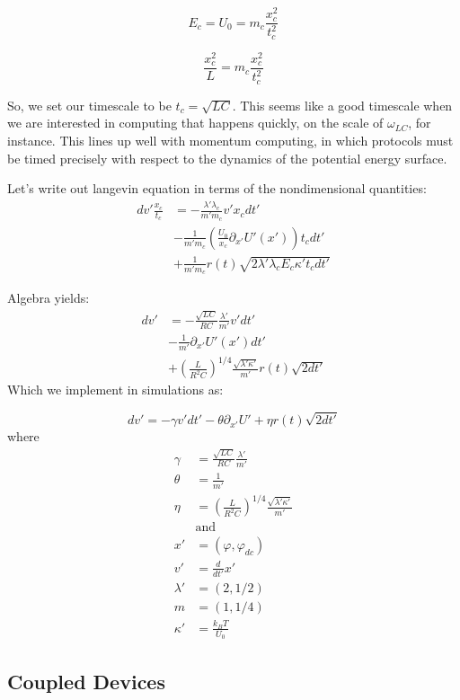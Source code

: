 \documentclass[paper=a4, twocolumn, fontsize=10pt]{article} %
\numberwithin{equation}{section} %
\numberwithin{figure}{section} %
\numberwithin{table}{section} %
\begin{document}
\[ E_c = U_0 = m_c \frac{ x^2_c}{t^2_c} \]

\[ \frac{x_c^2}{L} = m_c \frac{ x^2_c}{t^2_c} \]

So, we set our timescale to be $t_c = \sqrt{LC} $. This seems like a good timescale when we are interested in computing that happens quickly, on the scale of $\omega_{LC}$, for instance. This lines up well with momentum computing, in which protocols must be timed precisely with respect to the dynamics of the potential energy surface.


Let's write out langevin equation in terms of the nondimensional quantities:
\begin{align*}
dv' \frac{x_c}{t_c} &= -\frac{\lambda' \lambda_c}{m' m_c} v' x_c  dt' \\
 &- \frac{1}{m' m_c} \left(\frac{U_0}{x_c} \partial_{x'} U'(x')\right)  t_c dt' \\
  &+ \frac{1}{m'm_c} r(t)\sqrt{2\lambda'\lambda_c E_c \kappa' t_c dt'}
\end{align*}
    
Algebra yields:
\begin{align*}
dv' &= -\frac{\sqrt{LC} }{ RC} \frac{\lambda'}{m'} v' dt' \\
&- \frac{1 }{ m'}  \partial_{x'} U'(x') dt' \\
&+ \left(  \frac{L}{R^2 C} \right)^{1/4} \frac{\sqrt{\lambda'\kappa'}}{m'} r(t) \sqrt {2 dt'}
\end{align*}
Which we implement in simulations as:

 \[ dv' = -\gamma v' dt' - \theta \partial_{x'} U' + \eta r(t) \sqrt{2dt'} \]
where
\begin{align*}
    \gamma &=  \frac{\sqrt{LC} }{ RC} \frac{\lambda'}{m'}  \\
    \theta &= \frac{1 }{ m'} \\
    \eta &= \left(  \frac{L}{R^2 C} \right)^{1/4} \frac{\sqrt{\lambda'\kappa'}}{m'} \\
    &\text{and} \\
    x' &= (\varphi, \varphi_{dc}) \\
    v' &= \frac{d}{dt'} x' \\
    \lambda' &= (2, 1/2) \\
    m &= ( 1, 1/4) \\
    \kappa' &= \frac{k_B T}{U_0}
\end{align*}

\subsection{Coupled Devices}
\end{document}
